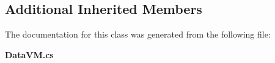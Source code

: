 \subsection*{Additional Inherited Members}


The documentation for this class was generated from the following file\+:\begin{DoxyCompactItemize}
\item 
\textbf{ Data\+V\+M.\+cs}\end{DoxyCompactItemize}
